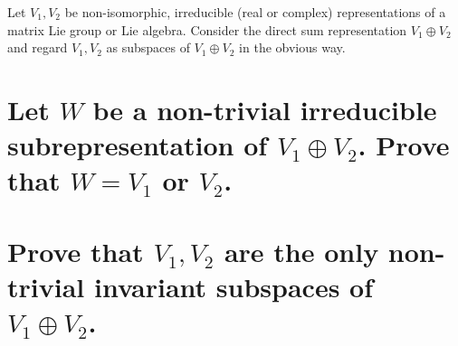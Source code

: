 \documentclass[
	pages,
	boxes,
	color=WildStrawberry
]{homework}
\begin{document}
\begin{problem}
Let $V_1, V_2$ be non-isomorphic, irreducible (real or complex) representations of a matrix Lie group or Lie algebra. Consider the direct sum representation $V_1 \oplus V_2$ and regard $V_1, V_2$ as subspaces of $V_1 \oplus V_2$ in the obvious way.
\begin{parts}
	\part{Let $W$ be a non-trivial irreducible subrepresentation of $V_1 \oplus V_2$. Prove that $W = V_1$ or $V_2$.}
	\part{Prove that $V_1, V_2$ are the only non-trivial invariant subspaces of $V_1 \oplus V_2$.}
\end{parts}
\end{problem}
\end{document}
